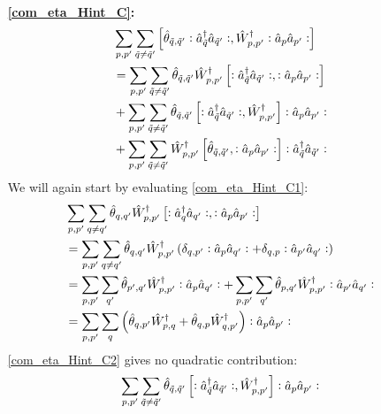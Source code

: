 \begin{appendix}
\begin{itemize}
\begin{align}
\end{align}
\item[\textbf{\ref{com_eta_Hint_C}:}]
\begin{subequations}
\begin{align}
& \sum\limits_{p, p^\prime}\sum\limits_{\tilde q\neq\tilde q^\prime} \left[\hat\theta_{\tilde q,\tilde q^\prime}\vcentcolon\hat a^\dagger_{\tilde q}\hat a_{\tilde q^\prime}\vcentcolon,\hat W_{p,p^\prime}^\dagger\vcentcolon\hat a_p\hat a_{p^\prime}\vcentcolon\right] \nonumber\\
&=\sum\limits_{p, p^\prime}\sum\limits_{\tilde q\neq\tilde q^\prime} \hat\theta_{\tilde q,\tilde q^\prime}\hat W_{p,p^\prime}^\dagger\left[\vcentcolon\hat a^\dagger_{\tilde q}\hat a_{\tilde q^\prime}\vcentcolon,\vcentcolon\hat a_p\hat a_{p^\prime}\vcentcolon\right]\label{com_eta_Hint_C1}\\
&+\sum\limits_{p, p^\prime}\sum\limits_{\tilde q\neq\tilde q^\prime}\hat\theta_{\tilde q,\tilde q^\prime}\left[\vcentcolon\hat a^\dagger_{\tilde q}\hat a_{\tilde q^\prime}\vcentcolon,\hat W_{p,p^\prime}^\dagger\right]\vcentcolon\hat a_p\hat a_{p^\prime}\vcentcolon\label{com_eta_Hint_C2}\\
&+\sum\limits_{p, p^\prime}\sum\limits_{\tilde q\neq\tilde q^\prime}\hat W_{p,p^\prime}^\dagger \left[\hat\theta_{\tilde q,\tilde q^\prime},\vcentcolon\hat a_p\hat a_{p^\prime}\vcentcolon\right]\vcentcolon\hat a^\dagger_{\tilde q}\hat a_{\tilde q^\prime}\vcentcolon\label{com_eta_Hint_C3}
\end{align}
\end{subequations}
We will again start by evaluating \ref{com_eta_Hint_C1}:
\begin{align}
&\sum\limits_{p, p^\prime}\sum\limits_{ q\neq q^\prime} \hat\theta_{ q, q^\prime}\hat W_{p,p^\prime}^\dagger\left[\vcentcolon\hat a^\dagger_{ q}\hat a_{ q^\prime}\vcentcolon,\vcentcolon\hat a_p\hat a_{p^\prime}\vcentcolon\right]\nonumber\\
&=\sum\limits_{p, p^\prime}\sum\limits_{ q\neq q^\prime} \hat\theta_{ q, q^\prime}\hat W_{p,p^\prime}^\dagger\left(\delta_{q,p^\prime}\vcentcolon\hat a_p\hat a_{q^\prime}\vcentcolon+\delta_{q,p}\vcentcolon\hat a_{p^\prime}\hat a_{q^\prime}\vcentcolon\right)\nonumber\\
&=\sum\limits_{p, p^\prime}\sum\limits_{q^\prime} \hat\theta_{ p^\prime, q^\prime}\hat W_{p,p^\prime}^\dagger\vcentcolon\hat a_p\hat a_{q^\prime}\vcentcolon+\sum\limits_{p, p^\prime}\sum\limits_{q^\prime}\hat\theta_{ p, q^\prime}\hat W_{p,p^\prime}^\dagger\vcentcolon\hat a_{p^\prime}\hat a_{q^\prime}\vcentcolon\nonumber\\
&=\sum\limits_{p, p^\prime}\sum\limits_{q}\left(\hat\theta_{ q, p^\prime}\hat W_{p,q}^\dagger+\hat\theta_{ q, p}\hat W_{q,p^\prime}^\dagger\right)\vcentcolon\hat a_{p}\hat a_{p^\prime}\vcentcolon
\end{align}
\ref{com_eta_Hint_C2} gives no quadratic contribution:
\begin{align}
&\Sum_{p, p^\prime}\Sum_{\tilde q\neq\tilde q^\prime}\hat\theta_{\tilde q,\tilde q^\prime}\left[\NO\CR_{\tilde q}\AN_{\tilde q^\prime}\NO,\hat W_{p,p^\prime}^\dagger\right]\NO\AN_p\AN_{p^\prime}\NO\nonumber\\

\end{align}
\end{itemize}
\end{appendix}
